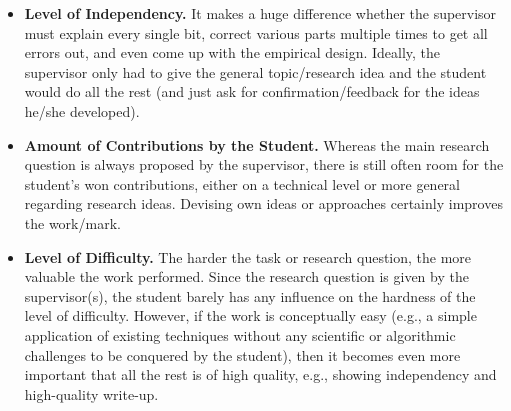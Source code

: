 \begin{itemize}
  \item \textbf{Level of Independency.} It makes a huge difference whether the supervisor must explain every single bit, correct various parts multiple times to get all errors out, and even come up with the empirical design. Ideally, the supervisor only had to give the general topic/research idea and the student would do all the rest (and just ask for confirmation/feedback for the ideas he/she developed).
  \item \textbf{Amount of Contributions by the Student.} Whereas the main research question is always proposed by the supervisor, there is still often room for the student's won contributions, either on a technical level or more general regarding research ideas. Devising own ideas or approaches certainly improves the work/mark.
  \item \textbf{Level of Difficulty.} The harder the task or research question, the more valuable the work performed. Since the research question is given by the supervisor(s), the student barely has any influence on the hardness of the level of difficulty. However, if the work is conceptually easy (e.g., a simple application of existing techniques without any scientific or algorithmic challenges to be conquered by the student), then it becomes even more important that all the rest is of high quality, e.g., showing independency and high-quality write-up.
\end{itemize}
